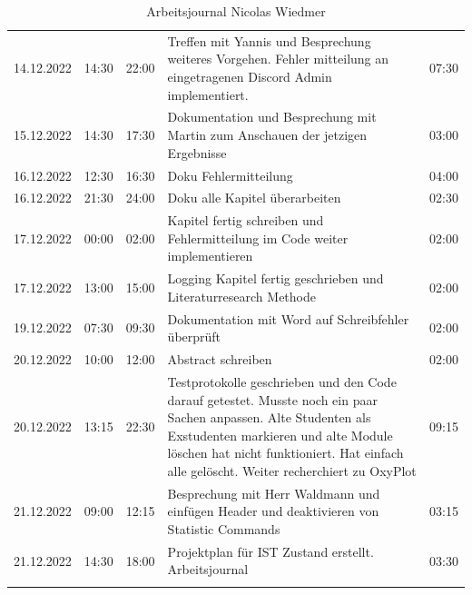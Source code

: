 \documentclass[a4paper, table]{article}
\begin{document}
\begin{longtable}[h]{|l|l|l|p{20em}|l|}
    14.12.2022 & 14:30 & 22:00 & Treffen mit Yannis und Besprechung weiteres   Vorgehen. Fehler mitteilung an eingetragenen Discord Admin implementiert. & 07:30  \\
    15.12.2022 & 14:30 & 17:30 & Dokumentation und Besprechung mit Martin zum Anschauen   der jetzigen Ergebnisse & 03:00  \\
    16.12.2022 & 12:30 & 16:30 & Doku Fehlermitteilung & 04:00 \\
    16.12.2022 & 21:30 & 24:00 & Doku alle Kapitel   überarbeiten & 02:30 \\
    17.12.2022 & 00:00 & 02:00 & Kapitel fertig schreiben und Fehlermitteilung im   Code weiter implementieren & 02:00 \\
    17.12.2022 & 13:00 & 15:00 & Logging Kapitel fertig geschrieben und   Literaturresearch Methode & 02:00 \\
    19.12.2022 & 07:30 & 09:30 & Dokumentation mit Word auf Schreibfehler   überprüft & 02:00 \\
    20.12.2022 & 10:00 & 12:00 & Abstract schreiben & 02:00  \\
    20.12.2022 & 13:15 & 22:30 & Testprotokolle geschrieben und den Code darauf   getestet. Musste noch ein paar Sachen anpassen. Alte Studenten als   Exstudenten markieren und alte Module löschen hat nicht funktioniert. Hat einfach alle   gelöscht. Weiter recherchiert zu OxyPlot & 09:15  \\
    21.12.2022 & 09:00 & 12:15 & Besprechung mit Herr Waldmann und einfügen Header   und deaktivieren von Statistic Commands & 03:15 \\
    21.12.2022 & 14:30 & 18:00 & Projektplan für IST Zustand erstellt.  Arbeitsjournal & 03:30 \\
    \hline
    \caption{Arbeitsjournal Nicolas Wiedmer}
    \label{tab:work-journal-nicolas}
\end{longtable}
\end{document}

